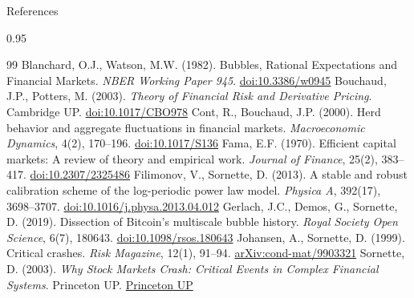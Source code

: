 \documentclass[9pt, aspectratio=169, t]{beamer}
\begin{document}
\begin{frame}{References}
    \begin{cminipage}{0.95\textwidth}
    {\scriptsize
    \begin{thebibliography}{99}
         Blanchard, O.J., Watson, M.W. (1982). Bubbles, Rational Expectations and Financial Markets. \textit{NBER Working Paper 945}. \href{https://doi.org/10.3386/w0945}{\textcolor{MainBlue}{doi:10.3386/w0945}}
         Bouchaud, J.P., Potters, M. (2003). \textit{Theory of Financial Risk and Derivative Pricing}. Cambridge UP. \href{https://doi.org/10.1017/CBO9780511753893}{\textcolor{MainBlue}{doi:10.1017/CBO978}}
         Cont, R., Bouchaud, J.P. (2000). Herd behavior and aggregate fluctuations in financial markets. \textit{Macroeconomic Dynamics}, 4(2), 170--196. \href{https://doi.org/10.1017/S1365100500015029}{\textcolor{MainBlue}{doi:10.1017/S136}}
         Fama, E.F. (1970). Efficient capital markets: A review of theory and empirical work. \textit{Journal of Finance}, 25(2), 383--417. \href{https://doi.org/10.2307/2325486}{\textcolor{MainBlue}{doi:10.2307/2325486}}
         Filimonov, V., Sornette, D. (2013). A stable and robust calibration scheme of the log-periodic power law model. \textit{Physica A}, 392(17), 3698--3707. \href{https://doi.org/10.1016/j.physa.2013.04.012}{\textcolor{MainBlue}{doi:10.1016/j.physa.2013.04.012}}
         Gerlach, J.C., Demos, G., Sornette, D. (2019). Dissection of Bitcoin's multiscale bubble history. \textit{Royal Society Open Science}, 6(7), 180643. \href{https://doi.org/10.1098/rsos.180643}{\textcolor{MainBlue}{doi:10.1098/rsos.180643}}
         Johansen, A., Sornette, D. (1999). Critical crashes. \textit{Risk Magazine}, 12(1), 91--94. \href{https://doi.org/10.48550/arXiv.cond-mat/9903321}{\textcolor{MainBlue}{arXiv:cond-mat/9903321}}
         Sornette, D. (2003). \textit{Why Stock Markets Crash: Critical Events in Complex Financial Systems}. Princeton UP. \href{https://press.princeton.edu/books/paperback/9780691175959/why-stock-markets-crash}{\textcolor{MainBlue}{Princeton UP}}
    \end{thebibliography}
    }
    \end{cminipage}
\end{frame}
\end{document}
